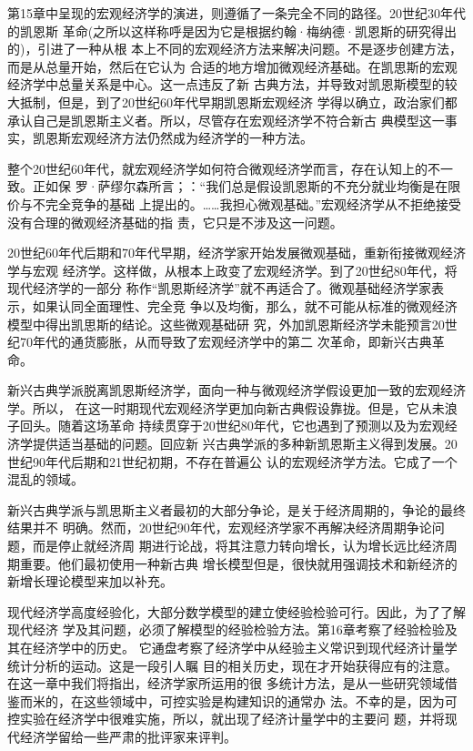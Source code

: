 第15章中呈现的宏观经济学的演进，则遵循了一条完全不同的路径。20世纪30年代的凯恩斯
革命(之所以这样称呼是因为它是根据约翰·梅纳德·凯恩斯的研究得出的)，引进了一种从根
本上不同的宏观经济方法来解决问题。不是逐步创建方法，而是从总量开始，然后在它认为
合适的地方增加微观经济基础。在凯思斯的宏观经济学中总量关系是中心。这一点违反了新
古典方法，并导致对凯恩斯模型的较大抵制，但是，到了20世纪60年代早期凯恩斯宏观经济
学得以确立，政治家们都承认自己是凯恩斯主义者。所以，尽管存在宏观经济学不符合新古
典模型这一事实，凯恩斯宏观经济方法仍然成为经济学的一种方法。

整个20世纪60年代，就宏观经济学如何符合微观经济学而言，存在认知上的不一致。正如保
罗·萨缪尔森所言；：“我们总是假设凯恩斯的不充分就业均衡是在限价与不完全竞争的基础
上提出的。……我担心微观基础。”宏观经济学从不拒绝接受没有合理的微观经济基础的指
责，它只是不涉及这一问题。

20世纪60年代后期和70年代早期，经济学家开始发展微观基础，重新衔接微观经济学与宏观
经济学。这样做，从根本上政变了宏观经济学。到了20世纪80年代，将现代经济学的一部分
称作“凯恩斯经济学”就不再适合了。微观基础经济学家表示，如果认同全面理性、完全竞
争以及均衡，那么，就不可能从标准的微观经济模型中得出凯思斯的结论。这些微观基础研
究，外加凯恩斯经济学未能预言20世纪70年代的通货膨胀，从而导致了宏观经济学中的第二
次革命，即新兴古典革命。

新兴古典学派脱离凯恩斯经济学，面向一种与微观经济学假设更加一致的宏观经济学。所以，
在这一时期现代宏观经济学更加向新古典假设靠拢。但是，它从未浪子回头。随着这场革命
持续贯穿于20世纪80年代，它也遇到了预测以及为宏观经济学提供适当基础的问题。回应新
兴古典学派的多种新凯恩斯主义得到发展。20世纪90年代后期和21世纪初期，不存在普遍公
认的宏观经济学方法。它成了一个混乱的领域。

新兴古典学派与凯思斯主义者最初的大部分争论，是关于经济周期的，争论的最终结果并不
明确。然而，20世纪90年代，宏观经济学家不再解决经济周期争论问题，而是停止就经济周
期进行论战，将其注意力转向增长，认为增长远比经济周期重要。他们最初使用一种新古典
增长模型但是，很快就用强调技术和新经济的新增长理论模型来加以补充。

现代经济学高度经验化，大部分数学模型的建立使经验检验可行。因此，为了了解现代经济
学及其问题，必须了解模型的经验检验方法。第16章考察了经验检验及其在经济学中的历史。
它通盘考察了经济学中从经验主义常识到现代经济计量学统计分析的运动。这是一段引人瞩
目的相关历史，现在才开始获得应有的注意。在这一章中我们将指出，经济学家所运用的很
多统计方法，是从一些研究领域借鉴而米的，在这些领域中，可控实验是构建知识的通常办
法。不幸的是，因为可控实验在经济学中很难实施，所以，就出现了经济计量学中的主要问
题，并将现代经济学留给一些严肃的批评家来评判。

